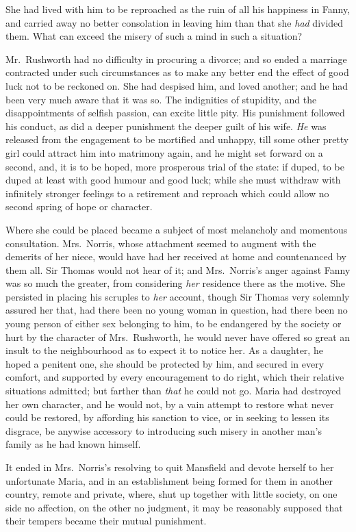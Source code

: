 She had lived with him to be reproached as the ruin
of all his happiness in Fanny, and carried away no better
consolation in leaving him than that she \emph{had} divided them.
What can exceed the misery of such a mind in such a situation?

Mr.\ Rushworth had no difficulty in procuring a divorce;
and so ended a marriage contracted under such circumstances
as to make any better end the effect of good luck not to
be reckoned on.  She had despised him, and loved another;
and he had been very much aware that it was so.
The indignities of stupidity, and the disappointments
of selfish passion, can excite little pity.  His punishment
followed his conduct, as did a deeper punishment the
deeper guilt of his wife.  \emph{He} was released from the
engagement to be mortified and unhappy, till some other
pretty girl could attract him into matrimony again,
and he might set forward on a second, and, it is to
be hoped, more prosperous trial of the state:  if duped,
to be duped at least with good humour and good luck;
while she must withdraw with infinitely stronger feelings
to a retirement and reproach which could allow no second
spring of hope or character.

Where she could be placed became a subject of most
melancholy and momentous consultation.  Mrs.\ Norris,
whose attachment seemed to augment with the demerits
of her niece, would have had her received at home and
countenanced by them all.  Sir Thomas would not hear of it;
and Mrs.\ Norris's anger against Fanny was so much the greater,
from considering \emph{her} residence there as the motive.
She persisted in placing his scruples to \emph{her} account,
though Sir Thomas very solemnly assured her that,
had there been no young woman in question, had there
been no young person of either sex belonging to him,
to be endangered by the society or hurt by the character
of Mrs.\ Rushworth, he would never have offered so great an
insult to the neighbourhood as to expect it to notice her.
As a daughter, he hoped a penitent one, she should be
protected by him, and secured in every comfort, and supported
by every encouragement to do right, which their relative
situations admitted; but farther than \emph{that} he could not go.
Maria had destroyed her own character, and he would not,
by a vain attempt to restore what never could be restored,
by affording his sanction to vice, or in seeking to lessen
its disgrace, be anywise accessory to introducing such
misery in another man's family as he had known himself.

It ended in Mrs.\ Norris's resolving to quit Mansfield
and devote herself to her unfortunate Maria, and in an
establishment being formed for them in another country,
remote and private, where, shut up together with little society,
on one side no affection, on the other no judgment,
it may be reasonably supposed that their tempers became
their mutual punishment.

